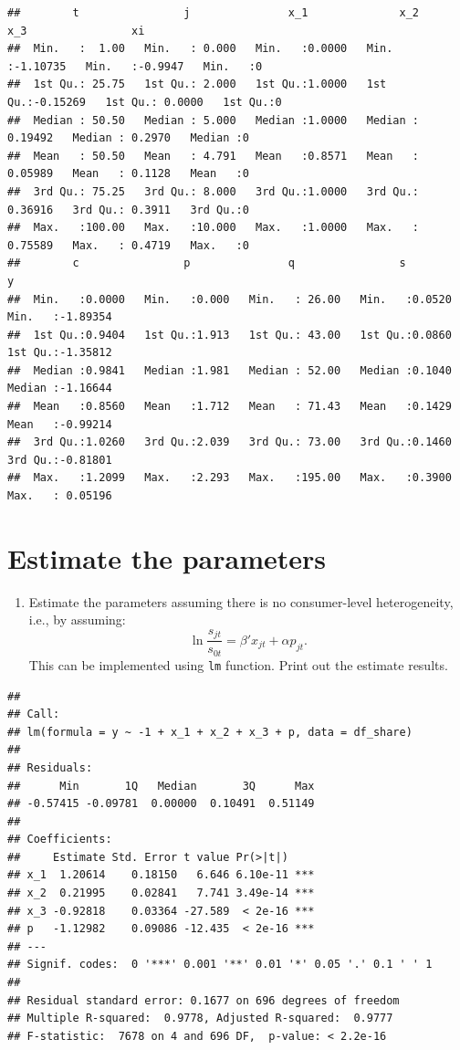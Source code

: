 \documentclass[
]{book}
\providecommand{\tightlist}{%
  \setlength{\itemsep}{0pt}\setlength{\parskip}{0pt}}
\begin{document}
\begin{verbatim}
##        t                j               x_1              x_2                x_3                xi   
##  Min.   :  1.00   Min.   : 0.000   Min.   :0.0000   Min.   :-1.10735   Min.   :-0.9947   Min.   :0  
##  1st Qu.: 25.75   1st Qu.: 2.000   1st Qu.:1.0000   1st Qu.:-0.15269   1st Qu.: 0.0000   1st Qu.:0  
##  Median : 50.50   Median : 5.000   Median :1.0000   Median : 0.19492   Median : 0.2970   Median :0  
##  Mean   : 50.50   Mean   : 4.791   Mean   :0.8571   Mean   : 0.05989   Mean   : 0.1128   Mean   :0  
##  3rd Qu.: 75.25   3rd Qu.: 8.000   3rd Qu.:1.0000   3rd Qu.: 0.36916   3rd Qu.: 0.3911   3rd Qu.:0  
##  Max.   :100.00   Max.   :10.000   Max.   :1.0000   Max.   : 0.75589   Max.   : 0.4719   Max.   :0  
##        c                p               q                s                y           
##  Min.   :0.0000   Min.   :0.000   Min.   : 26.00   Min.   :0.0520   Min.   :-1.89354  
##  1st Qu.:0.9404   1st Qu.:1.913   1st Qu.: 43.00   1st Qu.:0.0860   1st Qu.:-1.35812  
##  Median :0.9841   Median :1.981   Median : 52.00   Median :0.1040   Median :-1.16644  
##  Mean   :0.8560   Mean   :1.712   Mean   : 71.43   Mean   :0.1429   Mean   :-0.99214  
##  3rd Qu.:1.0260   3rd Qu.:2.039   3rd Qu.: 73.00   3rd Qu.:0.1460   3rd Qu.:-0.81801  
##  Max.   :1.2099   Max.   :2.293   Max.   :195.00   Max.   :0.3900   Max.   : 0.05196
\end{verbatim}

\hypertarget{estimate-the-parameters-1}{%
\section{Estimate the parameters}\label{estimate-the-parameters-1}}

\begin{enumerate}
\def\labelenumi{\arabic{enumi}.}
\tightlist
\item
  Estimate the parameters assuming there is no consumer-level heterogeneity, i.e., by assuming:
  \[
  \ln \frac{s_{jt}}{s_{0t}} = \beta' x_{jt} + \alpha p_{jt}.
  \]
  This can be implemented using \texttt{lm} function. Print out the estimate results.
\end{enumerate}

\begin{verbatim}
## 
## Call:
## lm(formula = y ~ -1 + x_1 + x_2 + x_3 + p, data = df_share)
## 
## Residuals:
##      Min       1Q   Median       3Q      Max 
## -0.57415 -0.09781  0.00000  0.10491  0.51149 
## 
## Coefficients:
##     Estimate Std. Error t value Pr(>|t|)    
## x_1  1.20614    0.18150   6.646 6.10e-11 ***
## x_2  0.21995    0.02841   7.741 3.49e-14 ***
## x_3 -0.92818    0.03364 -27.589  < 2e-16 ***
## p   -1.12982    0.09086 -12.435  < 2e-16 ***
## ---
## Signif. codes:  0 '***' 0.001 '**' 0.01 '*' 0.05 '.' 0.1 ' ' 1
## 
## Residual standard error: 0.1677 on 696 degrees of freedom
## Multiple R-squared:  0.9778, Adjusted R-squared:  0.9777 
## F-statistic:  7678 on 4 and 696 DF,  p-value: < 2.2e-16
\end{verbatim}
\end{document}
